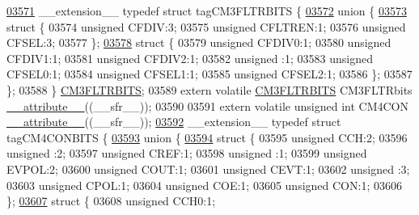 \begin{DoxyCode}
\hypertarget{a00009_source_l03571}{}\hyperlink{a00009}{03571} \_\_extension\_\_ \textcolor{keyword}{typedef} \textcolor{keyword}{struct }tagCM3FLTRBITS \{
\hypertarget{a00009_source_l03572}{}\hyperlink{a00009}{03572}   \textcolor{keyword}{union }\{
\hypertarget{a00009_source_l03573}{}\hyperlink{a00009}{03573}     \textcolor{keyword}{struct }\{
03574       \textcolor{keywordtype}{unsigned} CFDIV:3;
03575       \textcolor{keywordtype}{unsigned} CFLTREN:1;
03576       \textcolor{keywordtype}{unsigned} CFSEL:3;
03577     \};
\hypertarget{a00009_source_l03578}{}\hyperlink{a00009}{03578}     \textcolor{keyword}{struct }\{
03579       \textcolor{keywordtype}{unsigned} CFDIV0:1;
03580       \textcolor{keywordtype}{unsigned} CFDIV1:1;
03581       \textcolor{keywordtype}{unsigned} CFDIV2:1;
03582       \textcolor{keywordtype}{unsigned} :1;
03583       \textcolor{keywordtype}{unsigned} CFSEL0:1;
03584       \textcolor{keywordtype}{unsigned} CFSEL1:1;
03585       \textcolor{keywordtype}{unsigned} CFSEL2:1;
03586     \};
03587   \};
03588 \} \hyperlink{a00009_de/de9/a00322}{CM3FLTRBITS};
03589 \textcolor{keyword}{extern} \textcolor{keyword}{volatile} \hyperlink{a00009_de/de9/a00322}{CM3FLTRBITS} CM3FLTRbits \hyperlink{a00009_a493c46f03454991ccc5aa7a6e1dfb2a7}{\_\_attribute\_\_}((\_\_sfr\_\_));
03590 
03591 \textcolor{keyword}{extern} \textcolor{keyword}{volatile} \textcolor{keywordtype}{unsigned} \textcolor{keywordtype}{int}  CM4CON \hyperlink{a00009_a493c46f03454991ccc5aa7a6e1dfb2a7}{\_\_attribute\_\_}((\_\_sfr\_\_));
\hypertarget{a00009_source_l03592}{}\hyperlink{a00008}{03592} \_\_extension\_\_ \textcolor{keyword}{typedef} \textcolor{keyword}{struct }tagCM4CONBITS \{
\hypertarget{a00009_source_l03593}{}\hyperlink{a00009}{03593}   \textcolor{keyword}{union }\{
\hypertarget{a00009_source_l03594}{}\hyperlink{a00009}{03594}     \textcolor{keyword}{struct }\{
03595       \textcolor{keywordtype}{unsigned} CCH:2;
03596       \textcolor{keywordtype}{unsigned} :2;
03597       \textcolor{keywordtype}{unsigned} CREF:1;
03598       \textcolor{keywordtype}{unsigned} :1;
03599       \textcolor{keywordtype}{unsigned} EVPOL:2;
03600       \textcolor{keywordtype}{unsigned} COUT:1;
03601       \textcolor{keywordtype}{unsigned} CEVT:1;
03602       \textcolor{keywordtype}{unsigned} :3;
03603       \textcolor{keywordtype}{unsigned} CPOL:1;
03604       \textcolor{keywordtype}{unsigned} COE:1;
03605       \textcolor{keywordtype}{unsigned} CON:1;
03606     \};
\hypertarget{a00009_source_l03607}{}\hyperlink{a00009}{03607}     \textcolor{keyword}{struct }\{
03608       \textcolor{keywordtype}{unsigned} CCH0:1;

\end{DoxyCode}
